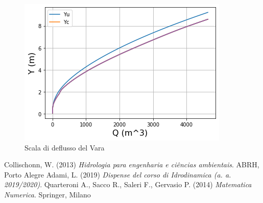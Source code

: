 \documentclass[12pt]{article} %
\begin{document}
\begin{figure} [H]
    \centering
    \includegraphics[scale=0.8]{deflussova.png}
    \caption{Scala di deflusso del Vara}
    \label{fig:Vara_scala_deflusso}
\end{figure}

\newpage

\begin{thebibliography}{}
Collischonn, W. (2013) \textit{Hidrologia para engenharia e ciências ambientais}. ABRH, Porto Alegre
Adami, L. (2019) \textit{Dispense del corso di Idrodinamica (a. a. 2019/2020)}.
Quarteroni A., Sacco R., Saleri F., Gervasio P. (2014) \textit{Matematica Numerica}. Springer, Milano
\end{thebibliography}
\end{document}
